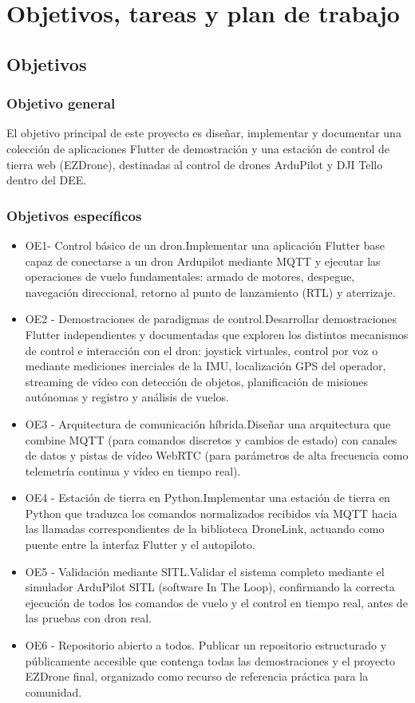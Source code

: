 \chapter{Objetivos, tareas y plan de trabajo}

\section{Objetivos}
\subsection{Objetivo general}
El objetivo principal de este proyecto es diseñar, implementar y documentar una colección de aplicaciones Flutter de demostración y una estación de control de tierra web (EZDrone), destinadas al control de drones ArduPilot y DJI Tello dentro del DEE. 

\subsection{Objetivos específicos}
\begin{itemize}
    \item {OE1- Control básico de un dron.}Implementar una aplicación Flutter base capaz de conectarse a un dron Ardupilot mediante MQTT y ejecutar las operaciones de vuelo fundamentales: armado de motores, despegue, navegación direccional, retorno al punto de lanzamiento (RTL) y aterrizaje.
    \item {OE2 - Demostraciones de paradigmas de control.}Desarrollar demostraciones Flutter independientes y documentadas que exploren los distintos mecanismos de control  e interacción con el dron: joystick virtuales, control por voz o mediante mediciones inerciales de la IMU, localización GPS del operador, streaming de vídeo con detección de objetos, planificación de misiones autónomas y registro y análisis de vuelos.
    \item {OE3 - Arquitectura de comunicación híbrida.}Diseñar una arquitectura que combine MQTT (para comandos discretos y cambios de estado) con canales de datos y pistas de vídeo WebRTC (para parámetros de alta frecuencia como telemetría continua y vídeo en tiempo real).
    \item {OE4 - Estación de tierra en Python.}Implementar una estación de tierra en Python que traduzca los comandos normalizados recibidos vía MQTT hacia las llamadas correspondientes de la biblioteca DroneLink, actuando como puente entre la interfaz Flutter y el autopiloto. 
    \item {OE5 - Validación mediante SITL.}Validar el sistema completo mediante el simulador ArduPilot SITL (software In The Loop), confirmando la correcta ejecución de todos los comandos de vuelo y el control en tiempo real, antes de las pruebas con dron real.
    \item {OE6 - Repositorio abierto a todos.}
    Publicar un repositorio estructurado y públicamente accesible que contenga todas las demostraciones y el proyecto EZDrone final, organizado como recurso de referencia práctica para la comunidad.
\end{itemize}

